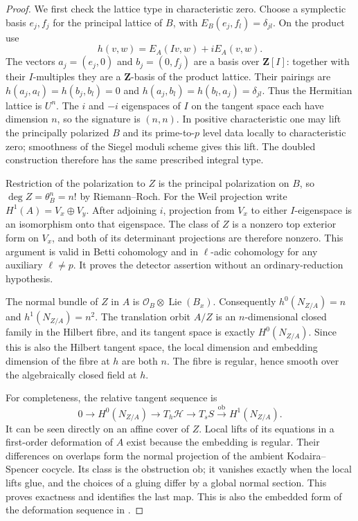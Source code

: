 \documentclass[11pt]{article}
\theoremstyle{definition}
\theoremstyle{remark}
\newcommand{\Z}{\mathbf Z}
\begin{document}
\begin{proof}
We first check the lattice type in characteristic zero.
Choose a symplectic basis $e_j,f_j$ for the principal lattice
of $B$, with $E_B(e_j,f_l)=\delta_{jl}$.  On the product use
\[
 h(v,w)=E_A(Iv,w)+iE_A(v,w).
\]
The vectors $a_j=(e_j,0)$ and $b_j=(0,f_j)$ are a basis over
$\Z[I]$: together with their $I$-multiples they are a
$\Z$-basis of the product lattice.  Their pairings are
$h(a_j,a_l)=h(b_j,b_l)=0$ and
$h(a_j,b_l)=h(b_l,a_j)=\delta_{jl}$.
Thus the Hermitian lattice is $U^n$.  The $i$ and $-i$
eigenspaces of $I$ on the tangent space each have dimension
$n$, so the signature is $(n,n)$.  In positive characteristic
one may lift the principally polarized $B$ and its prime-to-$p$
level data locally to characteristic zero; smoothness of the
Siegel moduli scheme gives this lift.  The doubled construction
therefore has the same prescribed integral type.

Restriction of the polarization to $Z$ is the principal
polarization on $B$, so $\deg Z=\theta_B^n=n!$ by
Riemann--Roch.  For the Weil projection write
$H^1(A)=V_x\oplus V_y$.  After adjoining $i$, projection from
$V_x$ to either $I$-eigenspace is an isomorphism onto that
eigenspace.  The class of $Z$ is a nonzero top exterior form
on $V_x$, and both of its determinant projections are therefore
nonzero.  This argument is valid in Betti cohomology and in
$\ell$-adic cohomology for any auxiliary $\ell\ne p$.
It proves the detector assertion without an ordinary-reduction
hypothesis.

The normal bundle of $Z$ in $A$ is
$\mathcal O_B\otimes\operatorname{Lie}(B_x)$.  Consequently
$h^0(N_{Z/A})=n$ and $h^1(N_{Z/A})=n^2$.
The translation orbit $A/Z$ is an $n$-dimensional closed family
in the Hilbert fibre, and its tangent space is exactly
$H^0(N_{Z/A})$.  Since this is also the Hilbert tangent space,
the local dimension and embedding dimension of the fibre at
$h$ are both $n$.  The fibre is regular, hence smooth over the
algebraically closed field at $h$.

For completeness, the relative tangent sequence is
\begin{equation}
 \label{eq:doubling-hilbert-tangent}
 0\longrightarrow H^0(N_{Z/A})
 \longrightarrow T_h\mathscr H
 \longrightarrow T_sS
 \xrightarrow{\mathrm{ob}} H^1(N_{Z/A}).
\end{equation}
It can be seen directly on an affine cover of $Z$.
Local lifts of its equations in a first-order deformation of
$A$ exist because the embedding is regular.  Their differences
on overlaps form the normal projection of the ambient
Kodaira--Spencer cocycle.  Its class is the obstruction
$\mathrm{ob}$; it vanishes exactly when the local lifts glue,
and the choices of a gluing differ by a global normal section.
This proves exactness and identifies the last map.  This is
also the embedded form of the deformation sequence in
\cite[Lemma~93.10.3, Tag~0E3S]{StacksDeformation}.


\end{proof}
\end{document}
